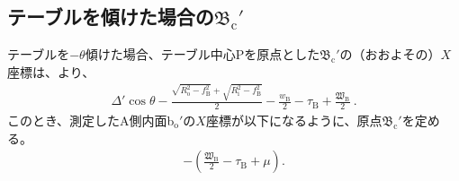 \subsection[テーブルを傾けた場合の\texorpdfstring{$\mathfrak B_\mathrm c'$}{Bc'}]
           {テーブルを傾けた場合の$\boldsymbol{\mathfrak B_\mathrm c'}$}
テーブルを$-\theta$傾けた場合、テーブル中心Pを原点とした\BottomOutcutCenter$\mathfrak B_\mathrm c'$の（おおよその）$X$座標は、より、
\begin{align}
  \label{eq:gaisakucenterBt}
  \Delta'\cos\theta-\frac{\sqrt{R_\mathrm o^2-f_\mathrm B^2}+\sqrt{R_\mathrm i^2-f_\mathrm B^2}}2
  -\frac{w_\mathrm B}2-\tau_\mathrm B+\frac{\mathfrak W_\mathrm B}2\ .
\end{align}
このとき、測定したA側内面b$_\mathrm o'$の$X$座標が以下になるように、原点$\mathfrak B_\mathrm c'$を定める。
\begin{align}
  \label{eq:gaisakucenterBr}
  -\left(\frac{\mathfrak W_\mathrm B}2-\tau_\mathrm B+\mu\right).
\end{align}


